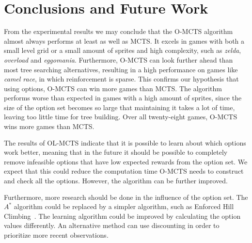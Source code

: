 \section{Conclusions and Future Work}
\label{sec:conclusion}
From the experimental results we may conclude that the O-MCTS algorithm almost
always performs at least as well as MCTS\@. It excels in games with both a small
level grid or a small amount of sprites and high complexity, such as
\textit{zelda}, \textit{overload} and \textit{eggomania}.  Furthermore, O-MCTS
can look further ahead than most tree searching alternatives, resulting in a
high performance on games like \textit{camel race}, in which reinforcement is
sparse. This confirms our hypothesis that using options, O-MCTS can win more
games than MCTS\@. The algorithm performs worse than expected in games with a
high amount of sprites, since the size of the option set becomes so large that
maintaining it takes a lot of time, leaving too little time for tree building.
Over all twenty-eight games, O-MCTS wins more games than MCTS\@.

The results of OL-MCTS indicate that it is possible to learn about which options
work better, meaning that in the future it should be possible to completely
remove infeasible options that have low expected rewards from the option set. We
expect that this could reduce the computation time O-MCTS needs to construct and
check all the options. However, the algorithm can be further improved.

Furthermore, more research should be done in the influence of the option set.
The $A^*$ algorithm could be replaced by a simpler algorithm, such as Enforced
Hill Climbing~\cite{ross2014general}.
The learning algorithm could be improved by calculating the option values
differently. An alternative method can use discounting in order to prioritize
more recent observations.

